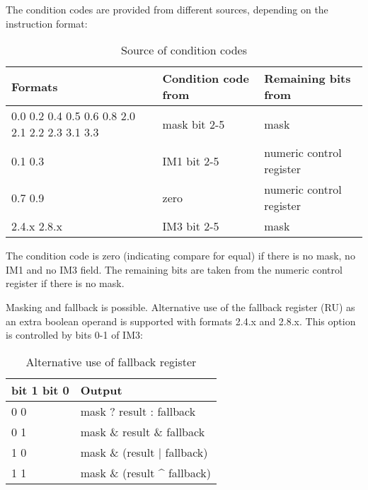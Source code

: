 \documentclass[forwardcom.tex]{subfiles}
\begin{document}
\vspace{2mm}
The condition codes are provided from different sources, depending on the instruction format:

\begin{longtable} {|p{25mm}|p{50mm}|p{50mm}|}
\caption{Source of condition codes} 
\label{table:SourceOfConditionCodes} \\
\endfirsthead
\endhead
\hline
\bfseries Formats & \bfseries Condition code from & \bfseries Remaining bits from \\
\hline
0.0 0.2 0.4 0.5 0.6 0.8 2.0 2.1 2.2 2.3 3.1 3.3 & mask bit 2-5 & mask \\
\hline
0.1 0.3     & IM1 bit 2-5 & numeric control register \\
\hline
0.7 0.9     & zero & numeric control register \\
\hline
2.4.x 2.8.x & IM3 bit 2-5 & mask  \\
\hline
\end{longtable}

The condition code is zero (indicating compare for equal) if there is no mask, no IM1 and no IM3 field. The remaining bits are taken from the numeric control register if there is no mask.

\vspace{2mm}
Masking and fallback is possible. Alternative use of the fallback register (RU) as an extra boolean operand is supported with formats 2.4.x and 2.8.x. This option is controlled by bits 0-1 of IM3:

\begin{longtable} {|p{25mm}|p{80mm}|}
\caption{Alternative use of fallback register} 
\label{table:AlternativeFallbackForCompare} \\
\endfirsthead
\endhead
\hline
\bfseries bit 1 bit 0 & \bfseries Output \\
\hline
\hspace{5mm} 0 0 & mask ? result : fallback \\
\hline
\hspace{5mm} 0 1 & mask \& result \& fallback \\
\hline
\hspace{5mm} 1 0 & mask \& (result $|$ fallback) \\
\hline
\hspace{5mm} 1 1 & mask \& (result \^{} fallback) \\
\hline
\end{longtable}
\vspace{2mm}
\end{document}
